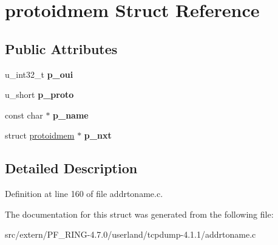 \hypertarget{structprotoidmem}{
\section{protoidmem Struct Reference}
\label{structprotoidmem}
}
\subsection*{Public Attributes}
\begin{DoxyCompactItemize}
\item 
\hypertarget{structprotoidmem_a278623b5635a5a5b0c7eb9847f869545}{
u\_\-int32\_\-t {\bfseries p\_\-oui}}
\label{structprotoidmem_a278623b5635a5a5b0c7eb9847f869545}

\item 
\hypertarget{structprotoidmem_afff607becb2929550c4661913f7be4f8}{
u\_\-short {\bfseries p\_\-proto}}
\label{structprotoidmem_afff607becb2929550c4661913f7be4f8}

\item 
\hypertarget{structprotoidmem_afc9a4d1b4bfc39c70a4c828a1688e23e}{
const char $\ast$ {\bfseries p\_\-name}}
\label{structprotoidmem_afc9a4d1b4bfc39c70a4c828a1688e23e}

\item 
\hypertarget{structprotoidmem_ac6db694cd18ba03f46f09107d385c527}{
struct \hyperlink{structprotoidmem}{protoidmem} $\ast$ {\bfseries p\_\-nxt}}
\label{structprotoidmem_ac6db694cd18ba03f46f09107d385c527}

\end{DoxyCompactItemize}


\subsection{Detailed Description}


Definition at line 160 of file addrtoname.c.



The documentation for this struct was generated from the following file:\begin{DoxyCompactItemize}
\item 
src/extern/PF\_\-RING-\/4.7.0/userland/tcpdump-\/4.1.1/addrtoname.c\end{DoxyCompactItemize}
